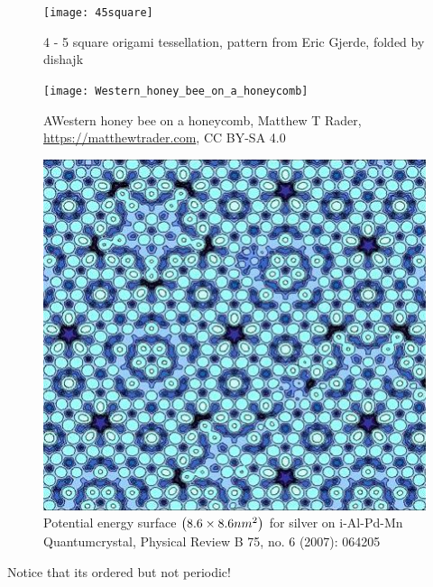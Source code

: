 \documentclass{beamer}
\begin{document}
\begin{frame}
    \begin{figure}
        \texttt{[image: 45square]}
        \caption{4 - 5 square origami tessellation, pattern from Eric Gjerde, folded by dishajk}
    \end{figure}
\end{frame}

\begin{frame}
\begin{figure}
    \texttt{[image: Western\_honey\_bee\_on\_a\_honeycomb]}
    \caption{ AWestern honey bee on a honeycomb, Matthew T Rader, \url{https://matthewtrader.com}, CC BY-SA 4.0}
\end{figure}
\end{frame}
\begin{frame}
    \begin{figure}
        \includegraphics[height=0.5\textheight]{Quasicrystal1}
        \caption{Potential energy surface $\qty(8.6 \times 8.6 nm^2)$ for silver on i-Al-Pd-Mn Quantumcrystal, Physical Review B 75, no. 6 (2007): 064205}
    \end{figure}
    Notice that its \alert{ordered} but \alert{not periodic}!
\end{frame}
\end{document}
